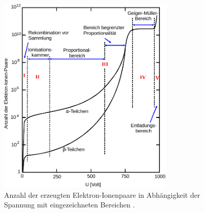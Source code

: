     \begin{figure}
      \centering
      \includegraphics[width=0.75\textwidth]{content/img/Abb_2.pdf}
      \caption{Anzahl der erzeugten Elektron-Ionenpaare in Abhängigkeit der Spannung mit eingezeichneten Bereichen \cite{versuchsanleitung}.}
      \label{fig:abb2}
    \end{figure}

